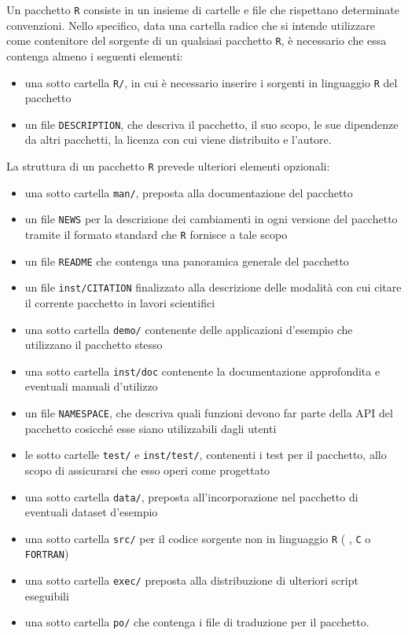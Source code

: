 Un pacchetto \lstinline$R$ consiste in un insieme di cartelle e file che rispettano determinate convenzioni. Nello specifico, data una cartella radice che si intende utilizzare come contenitore del sorgente di un qualsiasi pacchetto \lstinline$R$, è necessario che essa contenga almeno i seguenti elementi:
\begin{itemize}
	\item una sotto cartella \lstinline$R/$, in cui è necessario inserire i sorgenti in linguaggio \lstinline$R$ del pacchetto
	\item un file \lstinline$DESCRIPTION$, che descriva il pacchetto, il suo scopo, le sue dipendenze da altri pacchetti, la licenza con cui viene distribuito e l'autore.
\end{itemize}
La struttura di un pacchetto \lstinline$R$ prevede ulteriori elementi opzionali:
\begin{itemize}
	\item una sotto cartella \lstinline$man/$, preposta alla documentazione del pacchetto
	\item un file \lstinline$NEWS$ per la descrizione dei cambiamenti in ogni versione del pacchetto tramite il formato standard che \lstinline$R$ fornisce a tale scopo
	\item un file \lstinline$README$ che contenga una panoramica generale del pacchetto
	\item un file \lstinline$inst/CITATION$ finalizzato alla descrizione delle modalità con cui citare il corrente pacchetto in lavori scientifici
	\item una sotto cartella \lstinline$demo/$ contenente delle applicazioni d'esempio che utilizzano il pacchetto stesso
	\item una sotto cartella \lstinline$inst/doc$ contenente la documentazione approfondita e eventuali manuali d'utilizzo
	\item un file \lstinline$NAMESPACE$, che descriva quali funzioni devono far parte della \acs{API} del pacchetto cosicché esse siano utilizzabili dagli utenti
	\item le sotto cartelle \lstinline$test/$ e \lstinline$inst/test/$, contenenti i test per il pacchetto, allo scopo di assicurarsi che esso operi come progettato
	\item una sotto cartella \lstinline$data/$, preposta all'incorporazione nel pacchetto di eventuali dataset d'esempio
	\item una sotto cartella \lstinline$src/$ per il codice sorgente non in linguaggio \lstinline$R$ (\eg{} \CC{}, \lstinline$C$ o \lstinline$FORTRAN$)
	\item una sotto cartella \lstinline$exec/$ preposta alla distribuzione di ulteriori script eseguibili
	\item una sotto cartella \lstinline$po/$ che contenga i file di traduzione per il pacchetto.
\end{itemize}
